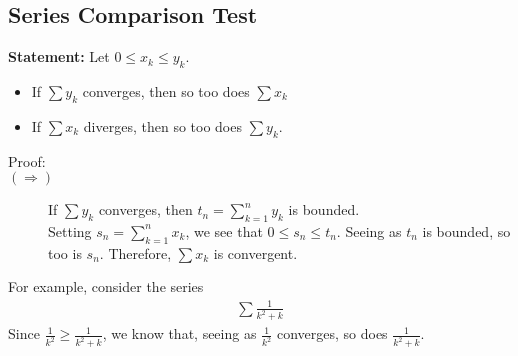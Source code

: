 \documentclass[10pt]{extarticle}
\begin{document}
  \subsection{Series Comparison Test}%
  \textbf{Statement:} Let $0 \leq x_k \leq y_k$.
    \begin{itemize}
      \item If $\sum y_k$ converges, then so too does $\sum x_k$
      \item If $\sum x_k$ diverges, then so too does $\sum y_k$.
    \end{itemize}
    \begin{description}
      \item[Proof:]\hfill
      \item[$(\Rightarrow)$] If $\sum y_k$ converges, then $t_n = \sum_{k=1}^{n}y_k$ is bounded.\\

        Setting $s_n = \sum_{k=1}^{n}x_k$, we see that $0 \leq s_n \leq t_n$. Seeing as $t_n$ is bounded, so too is $s_n$. Therefore, $\sum x_k$ is convergent.
    \end{description}
    For example, consider the series
    \begin{align*}
      \sum \frac{1}{k^2 + k}
    \end{align*}
    Since $\frac{1}{k^2} \geq \frac{1}{k^2 + k}$, we know that, seeing as $\frac{1}{k^2}$ converges, so does $\frac{1}{k^2 + k}$.
\end{document}

